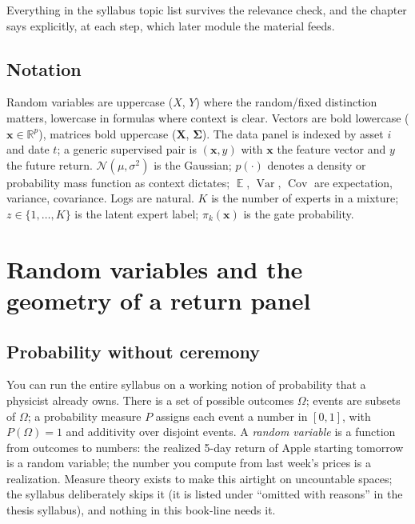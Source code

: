 \documentclass[11pt]{article}
\numberwithin{equation}{section}
\theoremstyle{plain}
\theoremstyle{definition}
\theoremstyle{remark}
\DeclareMathOperator{\E}{\mathbb{E}}
\DeclareMathOperator{\Var}{Var}
\DeclareMathOperator{\Cov}{Cov}
\newcommand{\Normal}{\mathcal{N}}
\newcommand{\R}{\mathbb{R}}
\newcommand{\x}{\bm{x}}
\newcommand{\bSigma}{\bm{\Sigma}}
\begin{document}
Everything in the syllabus topic list survives the relevance check, and the chapter says explicitly, at each step, which later module the material feeds.

\subsection*{Notation}

Random variables are uppercase ($X$, $Y$) where the random/fixed distinction matters, lowercase in formulas where context is clear. Vectors are bold lowercase ($\x \in \R^p$), matrices bold uppercase ($\bm{X}$, $\bSigma$). The data panel is indexed by asset $i$ and date $t$; a generic supervised pair is $(\x, y)$ with $\x$ the feature vector and $y$ the future return. $\Normal(\mu,\sigma^2)$ is the Gaussian; $p(\cdot)$ denotes a density or probability mass function as context dictates; $\E$, $\Var$, $\Cov$ are expectation, variance, covariance. Logs are natural. $K$ is the number of experts in a mixture; $z \in \{1,\dots,K\}$ is the latent expert label; $\pi_k(\x)$ is the gate probability.

\section{Random variables and the geometry of a return panel}\label{sec:rv}

\subsection{Probability without ceremony}

You can run the entire syllabus on a working notion of probability that a physicist already owns. There is a set of possible outcomes $\Omega$; events are subsets of $\Omega$; a probability measure $P$ assigns each event a number in $[0,1]$, with $P(\Omega)=1$ and additivity over disjoint events. A \emph{random variable} is a function from outcomes to numbers: the realized 5-day return of Apple starting tomorrow is a random variable; the number you compute from last week's prices is a realization. Measure theory exists to make this airtight on uncountable spaces; the syllabus deliberately skips it (it is listed under ``omitted with reasons'' in the thesis syllabus), and nothing in this book-line needs it.
\end{document}
